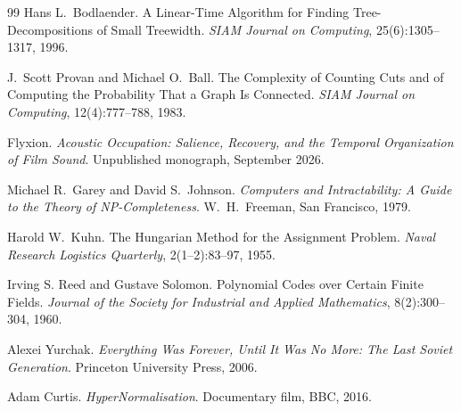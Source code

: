 \documentclass[11pt,twoside,openright]{book}
\theoremstyle{plain}
\theoremstyle{definition}
\theoremstyle{remark}
\begin{document}
\begin{thebibliography}{99}
Hans L.\ Bodlaender.
\newblock A Linear-Time Algorithm for Finding Tree-Decompositions of Small Treewidth.
\newblock \emph{SIAM Journal on Computing}, 25(6):1305--1317, 1996.

J.\ Scott Provan and Michael O.\ Ball.
\newblock The Complexity of Counting Cuts and of Computing the Probability That a Graph Is Connected.
\newblock \emph{SIAM Journal on Computing}, 12(4):777--788, 1983.

Flyxion.
\newblock \emph{Acoustic Occupation: Salience, Recovery, and the Temporal Organization of Film Sound}.
\newblock Unpublished monograph, September 2026.

Michael R.\ Garey and David S.\ Johnson.
\newblock \emph{Computers and Intractability: A Guide to the Theory of NP-Completeness}.
\newblock W.\ H.\ Freeman, San Francisco, 1979.

Harold W.\ Kuhn.
\newblock The Hungarian Method for the Assignment Problem.
\newblock \emph{Naval Research Logistics Quarterly}, 2(1--2):83--97, 1955.

Irving S. Reed and Gustave Solomon.
\newblock Polynomial Codes over Certain Finite Fields.
\newblock \emph{Journal of the Society for Industrial and Applied Mathematics}, 8(2):300--304, 1960.

Alexei Yurchak.
\newblock \emph{Everything Was Forever, Until It Was No More: The Last Soviet Generation}.
\newblock Princeton University Press, 2006.

Adam Curtis.
\newblock \emph{HyperNormalisation}.
\newblock Documentary film, BBC, 2016.

\end{thebibliography}
\end{document}
